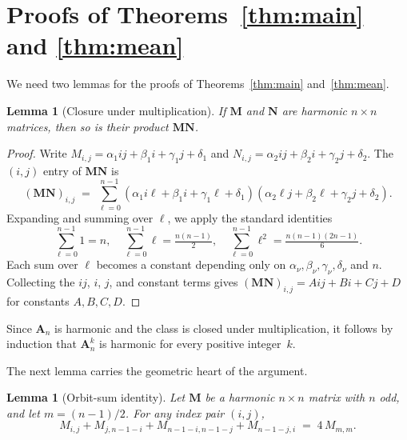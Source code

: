 \documentclass[a4paper,11pt]{article}
\theoremstyle{plain}
\newtheorem{lemma}[theorem]{Lemma}
\theoremstyle{definition}
\theoremstyle{remark}
\newcommand{\A}{\mathbf{A}}
\newcommand{\M}{\mathbf{M}}
\newcommand{\N}{\mathbf{N}}
\begin{document}
\section{Proofs of Theorems~\ref{thm:main} and \ref{thm:mean}} 

We need two lemmas for the proofs of Theorems~\ref{thm:main} and~\ref{thm:mean}.

\begin{lemma}[Closure under multiplication]
\label{lem:closure}
If $\M$ and $\N$ are harmonic $n\times n$ matrices, then so is their
product $\M\N$.
\end{lemma}

\begin{proof}
Write $M_{i,j}=\alpha_1 ij+\beta_1 i+\gamma_1 j+\delta_1$ and
$N_{i,j}=\alpha_2 ij+\beta_2 i+\gamma_2 j+\delta_2$.
The $(i,j)$ entry of $\M\N$ is
\[
  (\M\N)_{i,j}
  \;=\;\sum_{\ell=0}^{n-1}
    (\alpha_1 i\ell+\beta_1 i+\gamma_1 \ell+\delta_1)
    (\alpha_2 \ell j+\beta_2 \ell+\gamma_2 j+\delta_2).
\]
Expanding and summing over $\ell$, we apply the standard identities
\[
  \sum_{\ell=0}^{n-1}1=n,\quad
  \sum_{\ell=0}^{n-1}\ell=\tfrac{n(n-1)}{2},\quad
  \sum_{\ell=0}^{n-1}\ell^2=\tfrac{n(n-1)(2n-1)}{6}.
\]
Each sum over $\ell$ becomes a constant depending only on
$\alpha_\nu,\beta_\nu,\gamma_\nu,\delta_\nu$ and $n$.
Collecting the $ij$, $i$, $j$, and constant terms gives
$(\M\N)_{i,j}=Aij+Bi+Cj+D$ for constants $A,B,C,D$.
\end{proof}

Since $\A_n$ is harmonic and the class is closed under multiplication,
it follows by induction that $\A_n^k$ is harmonic for every positive
integer~$k$.

The next lemma carries the geometric heart of the argument.

\begin{lemma}[Orbit-sum identity]
\label{lem:orbit}
Let $\M$ be a harmonic $n\times n$ matrix with $n$ odd, and let
$m=(n-1)/2$. For any index pair $(i,j)$,
\[
  M_{i,j}+M_{j,n-1-i}+M_{n-1-i,n-1-j}+M_{n-1-j,i}
  \;=\;4\,M_{m,m}.
\]
\end{lemma}
\end{document}
